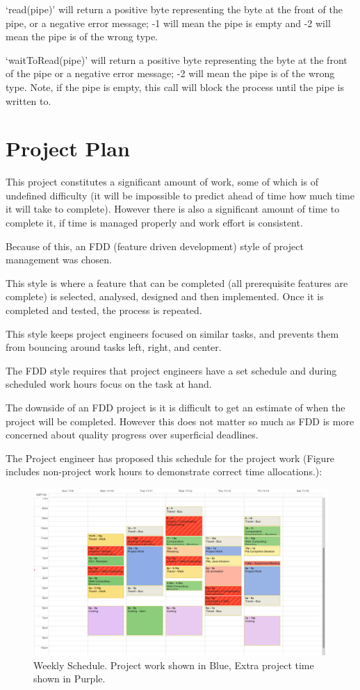 \documentclass[a4paper]{report}
\begin{document}
`read(pipe)' will return a positive byte representing the byte at the front of the pipe, or a negative error message; -1 will mean the pipe is empty and -2 will mean the pipe is of the wrong type.

`waitToRead(pipe)' will return a positive byte representing the byte at the front of the pipe or a negative error message; -2 will mean the pipe is of the wrong type. Note, if the pipe is empty, this call will block the process until the pipe is written to.

\chapter*{Project Plan}

This project constitutes a significant amount of work, some of which is of undefined difficulty (it will be impossible to predict ahead of time how much time it will take to complete). However there is also a significant amount of time to complete it, if time is managed properly and work effort is consistent.

Because of this, an FDD (feature driven development) style of project management was chosen.

This style is where a feature that can be completed (all prerequisite features are complete) is selected, analysed, designed and then implemented. Once it is completed and tested, the process is repeated.

This style keeps project engineers focused on similar tasks, and prevents them from bouncing around tasks left, right, and center.

The FDD style requires that project engineers have a set schedule and during scheduled work hours focus on the task at hand.

The downside of an FDD project is it is difficult to get an estimate of when the project will be completed. However this does not matter so much as FDD is more concerned about quality progress over superficial deadlines.

The Project engineer has proposed this schedule for the project work (Figure includes non-project work hours to demonstrate correct time allocations.):


\begin{figure}[ht]
\centering
\includegraphics[width=450px]{images/schedule_screenshot}
\caption{Weekly Schedule. Project work shown in Blue, Extra project time shown in Purple.}
\label{fig:schedulerscreen}
\end{figure}
\end{document}
